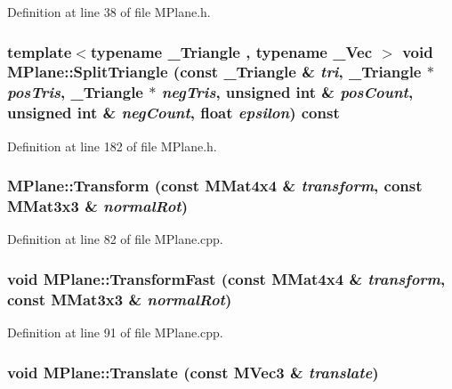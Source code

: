 Definition at line 38 of file MPlane.h.\hypertarget{class_m_plane_317bf47134f27459f8235712f4149b73}{
\subsubsection[{SplitTriangle}]{\setlength{\rightskip}{0pt plus 5cm}template$<$typename \_\-Triangle , typename \_\-Vec $>$ void MPlane::SplitTriangle (const \_\-Triangle \& {\em tri}, \/  \_\-Triangle $\ast$ {\em posTris}, \/  \_\-Triangle $\ast$ {\em negTris}, \/  unsigned int \& {\em posCount}, \/  unsigned int \& {\em negCount}, \/  float {\em epsilon}) const}}
\label{class_m_plane_317bf47134f27459f8235712f4149b73}




Definition at line 182 of file MPlane.h.\hypertarget{class_m_plane_a57251c5e40213bcd468e3c9fe5c39e9}{
\subsubsection[{Transform}]{ MPlane::Transform (const {\bf MMat4x4} \& {\em transform}, \/  const {\bf MMat3x3} \& {\em normalRot})}}
\label{class_m_plane_a57251c5e40213bcd468e3c9fe5c39e9}




Definition at line 82 of file MPlane.cpp.\hypertarget{class_m_plane_11f678fce27735113c0c921508534103}{
\subsubsection[{TransformFast}]{\setlength{\rightskip}{0pt plus 5cm}void MPlane::TransformFast (const {\bf MMat4x4} \& {\em transform}, \/  const {\bf MMat3x3} \& {\em normalRot})}}
\label{class_m_plane_11f678fce27735113c0c921508534103}




Definition at line 91 of file MPlane.cpp.\hypertarget{class_m_plane_de0c41112fd9d1c27830edcf906d9638}{
\subsubsection[{Translate}]{\setlength{\rightskip}{0pt plus 5cm}void MPlane::Translate (const {\bf MVec3} \& {\em translate})}}
\label{class_m_plane_de0c41112fd9d1c27830edcf906d9638}




